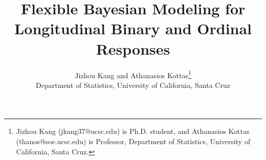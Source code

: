 \documentclass[12pt]{article}
\begin{document}
\def\spacingset#1{\renewcommand{\baselinestretch}%
{#1}\small\normalsize} \spacingset{1}

%


%





\title{\bf Flexible Bayesian Modeling for Longitudinal Binary and Ordinal Responses}
%
\author{Jizhou Kang and Athanasios Kottas\thanks{Jizhou Kang (jkang37@ucsc.edu)
is Ph.D. student, and Athanasios Kottas (thanos@soe.ucsc.edu) is Professor, Department 
of Statistics, University of California, Santa Cruz.} \\
  Department of Statistics, University of California, Santa Cruz\\
}
%
\maketitle  
\end{document}
